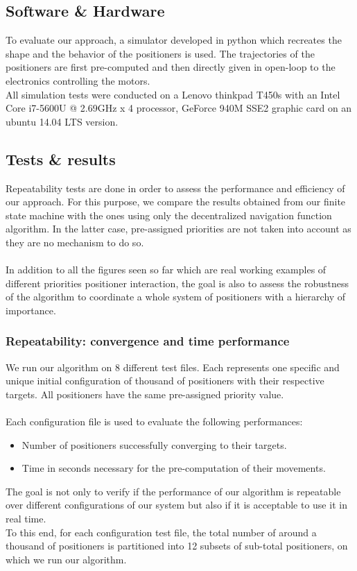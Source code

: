 \documentclass[]{spie}  %
\begin{document}
	\subsection{Software \& Hardware}
	\label{Software Hardware}
	To evaluate our approach, a simulator developed in python which recreates the shape and the behavior of the positioners is used. The trajectories of the positioners are first pre-computed and then directly given in open-loop to the electronics controlling the motors.\\  
	All simulation tests were conducted on a Lenovo thinkpad T450s with an Intel Core i7-5600U @ 2.69GHz x 4 processor, GeForce 940M SSE2 graphic card on an ubuntu 14.04 LTS version.
	\subsection{Tests \& results}
	\label{Test cases}
	
	Repeatability tests are done in order to assess the performance and efficiency of our approach. For this purpose, we compare the results obtained from our finite state machine with the ones using only the decentralized navigation function algorithm. In the latter case, pre-assigned priorities are not taken into account as they are no mechanism to do so.\\\\
	In addition to all the figures seen so far which are real working examples of different priorities positioner interaction, the goal is also to assess the robustness of the algorithm to coordinate a whole system of positioners with a hierarchy of importance.
	
	\subsubsection{Repeatability: convergence and time performance}
	We run our algorithm on 8 different test files. Each represents one specific and unique initial configuration of thousand of positioners with their respective targets. All positioners have the same pre-assigned priority value.\\\\
	Each configuration file is used to evaluate the following performances: 
	\begin{itemize}
		\item Number of positioners successfully converging to their targets.
		\item Time in seconds necessary for the pre-computation of their movements.
	\end{itemize}
	The goal is not only to verify if the performance of our algorithm is repeatable over different configurations of our system but also if it is acceptable to use it in real time.\\
	To this end, for each configuration test file, the total number of around a thousand of positioners is partitioned into 12 subsets of sub-total positioners, on which we run our algorithm.
	
\end{document}
